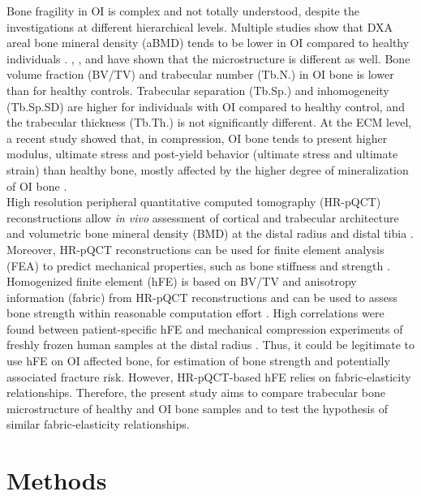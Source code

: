 \documentclass[a4paper,fleqn]{DC_ArtStyle}
\begin{document}
Bone fragility in OI is complex and not totally understood, despite the investigations at different hierarchical levels. Multiple studies show that DXA areal bone mineral density (aBMD) tends to be lower in OI compared to healthy individuals \cite{Folkestad2012,Lindahl2015,Scheres2018}.  \citeauthor{Folkestad2012}\cite{Folkestad2012}, \citeauthor{Kocijan2015}\cite{Kocijan2015}, and \citeauthor{Rolvien2018}\cite{Rolvien2018} have shown that the microstructure is different as well. Bone volume fraction (BV/TV) and trabecular number (Tb.N.) in OI bone is lower than for healthy controls. Trabecular separation (Tb.Sp.) and inhomogeneity (Tb.Sp.SD) are higher for individuals with OI compared to healthy control, and the trabecular thickness (Tb.Th.) is not significantly different. At the ECM level, a recent study showed that, in compression, OI bone tends to present higher modulus, ultimate stress and post-yield behavior (ultimate stress and ultimate strain) than healthy bone, mostly affected by the higher degree of mineralization of OI bone \cite{Indermaur2021}.\\

High resolution peripheral quantitative computed tomography (HR-pQCT) reconstructions allow \textit{in vivo} assessment of cortical and trabecular architecture and volumetric bone mineral density (BMD) at the distal radius and distal tibia \cite{Boutroy2005}. Moreover, HR-pQCT reconstructions can be used for finite element analysis (FEA) to predict mechanical properties, such as bone stiffness and strength \cite{Boutroy2008}. Homogenized finite element (hFE) is based on BV/TV and anisotropy information (fabric) from HR-pQCT reconstructions and can be used to assess bone strength within reasonable computation effort \cite{Pahr2009}. High correlations were found between patient-specific hFE and mechanical compression experiments of freshly frozen human samples at the distal radius \cite{Varga2011,Hosseini2017,AriasMoreno2019}. Thus, it could be legitimate to use hFE on OI affected bone, for estimation of bone strength and potentially associated fracture risk. However, HR-pQCT-based hFE relies on fabric-elasticity relationships. Therefore, the present study aims to compare trabecular bone microstructure of healthy and OI bone samples and to test the hypothesis of similar fabric-elasticity relationships.

%
%
%
%
%
%

\section{Methods}
\end{document}
